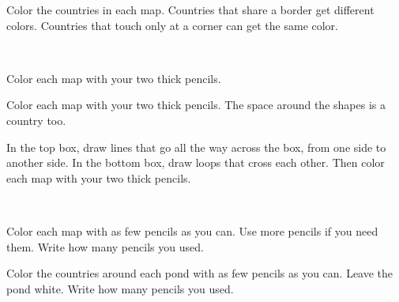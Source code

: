 \documentclass[14pt]{extarticle}
\newcommand{\kmap}[1]{\begin{minipage}[t]{0.47\linewidth}\centering\fig{#1}\par\vspace{0.25cm}\hfill\numbox\end{minipage}}
\begin{document}
\large

Color the countries in each map. Countries that share a border get different colors. Countries that touch only at a corner can get the same color.

\vspace{0.3cm}
\centerline{\,\raisebox{0.3cm}{\Huge$\checkmark$}\hspace{1.4cm}\,\raisebox{0.3cm}{\scalebox{1.6}{\Huge$\times$}}\hspace{1.4cm}\,\raisebox{0.3cm}{\Huge$\checkmark$}}

\vspace{0.6cm}
Color each map with your two thick pencils.

\vspace{0.4cm}
\centerline{}
\vspace{0.6cm}
\centerline{}

\newpage
{}Color each map with your two thick pencils. The space around the shapes is a country too.

\vspace{0.5cm}
\centerline{}
\vspace{0.8cm}
\centerline{}

\newpage
{}In the top box, draw lines that go all the way across the box, from one side to another side. In the bottom box, draw loops that cross each other. Then color each map with your two thick pencils.

\vspace{0.3cm}
\centerline{\,\raisebox{0.5cm}{\Huge$\checkmark$}\hspace{1.6cm}\,\raisebox{0.5cm}{\scalebox{1.6}{\Huge$\times$}}}

\vspace{0.5cm}
\centerline{}
\vspace{0.5cm}
\centerline{}

\newpage
{}Color each map with as few pencils as you can. Use more pencils if you need them. Write how many pencils you used.

\vspace{0.8cm}
\noindent\kmap{k_T}\hfill\kmap{k_plus}

\vspace{1.2cm}
\noindent\kmap{k_Y}\hfill\kmap{k_lineloop}

\newpage
{}Color the countries around each pond with as few pencils as you can. Leave the pond white. Write how many pencils you used.
\end{document}
